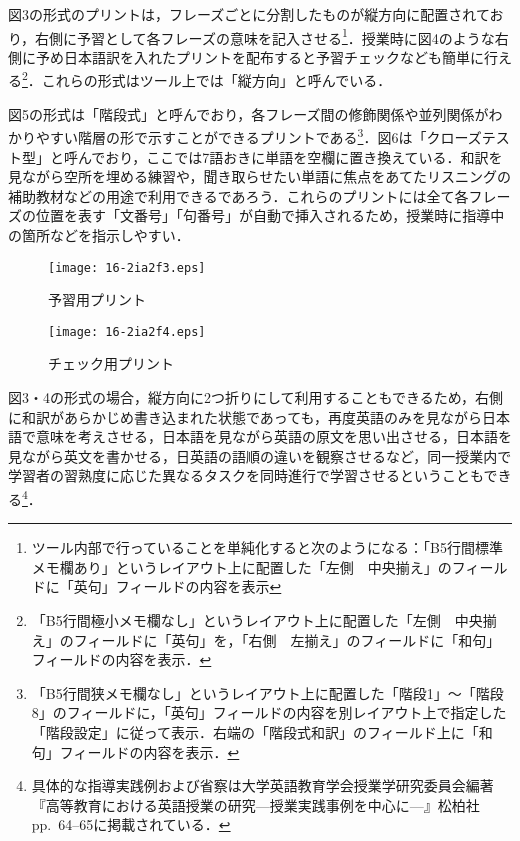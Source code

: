 \documentclass[japanese]{jnlp_1.4}
\begin{document}
図3の形式のプリントは，フレーズごとに分割したものが縦方向に配置されており，右側に予習として各フレーズの意味を記入させる\footnote{ツール内部で行っていることを単純化すると次のようになる：「B5行間標準メモ欄あり」というレイアウト上に配置した「左側　中央揃え」のフィールドに「英句」フィールドの内容を表示}．授業時に図4のような右側に予め日本語訳を入れたプリントを配布すると予習チェックなども簡単に行える\footnote{「B5行間極小メモ欄なし」というレイアウト上に配置した「左側　中央揃え」のフィールドに「英句」を，「右側　左揃え」のフィールドに「和句」フィールドの内容を表示．}．これらの形式はツール上では「縦方向」と呼んでいる．

図5の形式は「階段式」と呼んでおり，各フレーズ間の修飾関係や並列関係がわかりやすい階層の形で示すことができるプリントである\footnote{「B5行間狭メモ欄なし」というレイアウト上に配置した「階段1」〜「階段8」のフィールドに，「英句」フィールドの内容を別レイアウト上で指定した「階段設定」に従って表示．右端の「階段式和訳」のフィールド上に「和句」フィールドの内容を表示．}．図6は「クローズテスト型」と呼んでおり，ここでは7語おきに単語を空欄に置き換えている．和訳を見ながら空所を埋める練習や，聞き取らせたい単語に焦点をあてたリスニングの補助教材などの用途で利用できるであろう．これらのプリントには全て各フレーズの位置を表す「文番号」「句番号」が自動で挿入されるため，授業時に指導中の箇所などを指示しやすい．

\begin{figure}[t]
 \begin{minipage}{0.45\textwidth}
  \begin{center}
    \texttt{[image: 16-2ia2f3.eps]}
  \end{center}
  \caption{予習用プリント}
 \end{minipage}
\hfill
 \begin{minipage}{0.45\textwidth}
   \begin{center}
     \texttt{[image: 16-2ia2f4.eps]}
   \end{center}
   \caption{チェック用プリント}
 \end{minipage}
\end{figure}



図3・4の形式の場合，縦方向に2つ折りにして利用することもできるため，右側に和訳があらかじめ書き込まれた状態であっても，再度英語のみを見ながら日本語で意味を考えさせる，日本語を見ながら英語の原文を思い出させる，日本語を見ながら英文を書かせる，日英語の語順の違いを観察させるなど，同一授業内で学習者の習熟度に応じた異なるタスクを同時進行で学習させるということもできる\footnote{具体的な指導実践例および省察は大学英語教育学会授業学研究委員会編著『高等教育における英語授業の研究—授業実践事例を中心に—』松柏社 pp.~64--65に掲載されている．}．
\end{document}
